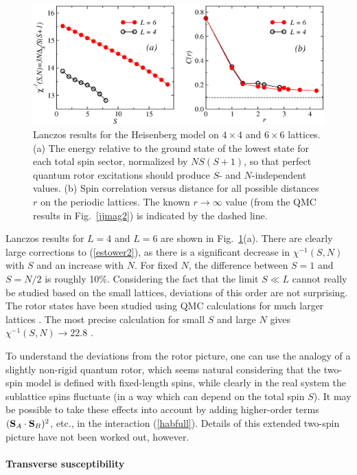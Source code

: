 \documentclass[draft,numberedheadings]{aipproc}
\begin{document}
\begin{figure}
\includegraphics[width=12cm, clip]{tower2d.eps}
\caption{Lanczos results for the Heisenberg model on $4\times 4$ and $6\times 6$ lattices. (a) The energy relative to the ground state  of the lowest 
state for each total spin sector, normalized by $NS(S+1)$, so that perfect quantum rotor excitations should produce $S$- and $N$-independent values.
(b) Spin correlation versus distance for all possible distances $r$ on the periodic lattices. The known $r\to \infty$ value (from the QMC results 
in Fig.~\ref{jjmag2}) is indicated by the dashed line.}
\label{tower2d}
\end{figure}

Lanczos results for $L=4$ and $L=6$ are shown in Fig.~\ref{tower2d}(a). There are clearly large corrections to (\ref{estower2}), as there is a 
significant decrease in $\chi^{-1}(S,N)$ with $S$ and an increase with $N$. For fixed $N$, the difference between $S=1$ and $S=N/2$ is roughly 10\%. 
Considering the fact that the limit $S \ll L$ cannot really be studied based on the small lattices, deviations of this order are not surprising. 
The rotor states have been studied using QMC calculations for much larger lattices \cite{lavalle,syljuasen02}. The most precise calculation for small 
$S$ and large $N$ gives $\chi^{-1}(S,N) \to 22.8$ \cite{syljuasen02}.

To understand the deviations from the rotor picture, one can use the analogy of a slightly non-rigid quantum rotor, which seems natural considering 
that the two-spin model is defined with fixed-length spins, while clearly in the real system the sublattice spins fluctuate (in a way which can 
depend on the total spin $S$). It may be possible to take these effects into account by adding higher-order terms $({\bf S}_A\cdot {\bf S}_B)^2$,
etc., in the interaction (\ref{habfull}). Details of this extended two-spin picture have not been worked out, however.

\paragraph{Transverse susceptibility}
\end{document}
